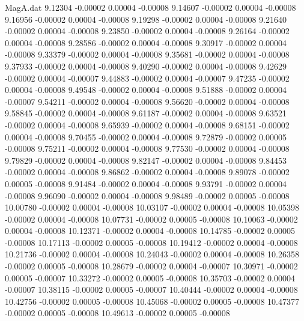 \begin{filecontents}{MagA.dat}
   9.12304   -0.00002    0.00004   -0.00008
   9.14607   -0.00002    0.00004   -0.00008
   9.16956   -0.00002    0.00004   -0.00008
   9.19298   -0.00002    0.00004   -0.00008
   9.21640   -0.00002    0.00004   -0.00008
   9.23850   -0.00002    0.00004   -0.00008
   9.26164   -0.00002    0.00004   -0.00008
   9.28586   -0.00002    0.00004   -0.00008
   9.30917   -0.00002    0.00004   -0.00008
   9.33379   -0.00002    0.00004   -0.00008
   9.35681   -0.00002    0.00004   -0.00008
   9.37933   -0.00002    0.00004   -0.00008
   9.40290   -0.00002    0.00004   -0.00008
   9.42629   -0.00002    0.00004   -0.00007
   9.44883   -0.00002    0.00004   -0.00007
   9.47235   -0.00002    0.00004   -0.00008
   9.49548   -0.00002    0.00004   -0.00008
   9.51888   -0.00002    0.00004   -0.00007
   9.54211   -0.00002    0.00004   -0.00008
   9.56620   -0.00002    0.00004   -0.00008
   9.58845   -0.00002    0.00004   -0.00008
   9.61187   -0.00002    0.00004   -0.00008
   9.63521   -0.00002    0.00004   -0.00008
   9.65939   -0.00002    0.00004   -0.00008
   9.68151   -0.00002    0.00004   -0.00008
   9.70455   -0.00002    0.00004   -0.00008
   9.72879   -0.00002    0.00005   -0.00008
   9.75211   -0.00002    0.00004   -0.00008
   9.77530   -0.00002    0.00004   -0.00008
   9.79829   -0.00002    0.00004   -0.00008
   9.82147   -0.00002    0.00004   -0.00008
   9.84453   -0.00002    0.00004   -0.00008
   9.86862   -0.00002    0.00004   -0.00008
   9.89078   -0.00002    0.00005   -0.00008
   9.91484   -0.00002    0.00004   -0.00008
   9.93791   -0.00002    0.00004   -0.00008
   9.96090   -0.00002    0.00004   -0.00008
   9.98489   -0.00002    0.00005   -0.00008
  10.00780   -0.00002    0.00004   -0.00008
  10.03107   -0.00002    0.00004   -0.00008
  10.05398   -0.00002    0.00004   -0.00008
  10.07731   -0.00002    0.00005   -0.00008
  10.10063   -0.00002    0.00004   -0.00008
  10.12371   -0.00002    0.00004   -0.00008
  10.14785   -0.00002    0.00005   -0.00008
  10.17113   -0.00002    0.00005   -0.00008
  10.19412   -0.00002    0.00004   -0.00008
  10.21736   -0.00002    0.00004   -0.00008
  10.24043   -0.00002    0.00004   -0.00008
  10.26358   -0.00002    0.00005   -0.00008
  10.28679   -0.00002    0.00004   -0.00007
  10.30971   -0.00002    0.00005   -0.00007
  10.33272   -0.00002    0.00005   -0.00008
  10.35703   -0.00002    0.00004   -0.00007
  10.38115   -0.00002    0.00005   -0.00007
  10.40444   -0.00002    0.00004   -0.00008
  10.42756   -0.00002    0.00005   -0.00008
  10.45068   -0.00002    0.00005   -0.00008
  10.47377   -0.00002    0.00005   -0.00008
  10.49613   -0.00002    0.00005   -0.00008

\end{filecontents}
